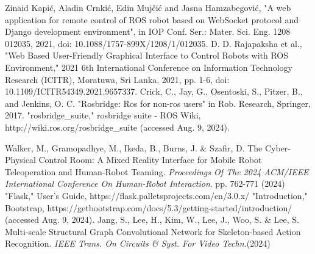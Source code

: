 \documentclass[letterpaper, 10 pt, conference]{ieeeconf}  %
\begin{document}
\begin{thebibliography}{99}
 Zinaid Kapić, Aladin Crnkić, Edin Mujčić and Jasna Hamzabegović, "A web application for remote control of ROS robot based on WebSocket protocol and Django development environment", in IOP Conf. Ser.: Mater. Sci. Eng. 1208 012035, 2021, doi: 10.1088/1757-899X/1208/1/012035.
 D. D. Rajapaksha et al., "Web Based User-Friendly Graphical Interface to Control Robots with ROS Environment," 2021 6th International Conference on Information Technology Research (ICITR), Moratuwa, Sri Lanka, 2021, pp. 1-6, doi: 10.1109/ICITR54349.2021.9657337.
 Crick, C., Jay, G., Osentoski, S., Pitzer, B., and Jenkins, O. C. "Rosbridge: Ros for non-ros users" in Rob. Research, Springer, 2017.
"rosbridge\_suite," rosbridge suite - ROS Wiki, http://wiki.ros.org/rosbridge\_suite (accessed Aug. 9, 2024).

Walker, M., Gramopadhye, M., Ikeda, B., Burns, J. \& Szafir, D. The Cyber-Physical Control Room: A Mixed Reality Interface for Mobile Robot Teleoperation and Human-Robot Teaming. {\em Proceedings Of The 2024 ACM/IEEE International Conference On Human-Robot Interaction}. pp. 762-771 (2024)
"Flask," User’s Guide, https://flask.palletsprojects.com/en/3.0.x/
"Introduction," Bootstrap, https://getbootstrap.com/docs/5.3/getting-started/introduction/ (accessed Aug. 9, 2024).
Jang, S., Lee, H., Kim, W., Lee, J., Woo, S. \& Lee, S. Multi-scale Structural Graph Convolutional Network for Skeleton-based Action Recognition. {\em IEEE Trans. On Circuits \& Syst. For Video Techn.}(2024)










\end{thebibliography}
\end{document}
